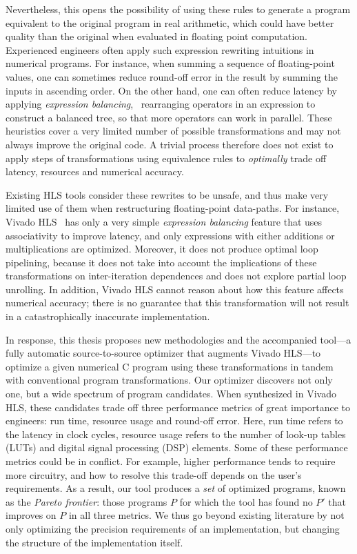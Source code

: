 Nevertheless, this opens the possibility of using these rules to generate a
program equivalent to the original program in real arithmetic, which could
have better quality than the original when evaluated in floating point
computation.  Experienced engineers often apply such expression rewriting
intuitions in numerical programs.  For instance, when summing a sequence
of floating-point values, one can sometimes reduce round-off error in the
result by summing the inputs in ascending order.  On the other hand, one can
often reduce latency by applying \emph{expression balancing}, \ie~rearranging
operators in an expression to construct a balanced tree, so that more operators
can work in parallel.  These heuristics cover a very limited number of
possible transformations and may not always improve the original code.  A
trivial process therefore does not exist to apply steps of transformations
using equivalence rules to \emph{optimally} trade off latency, resources and
numerical accuracy.

Existing HLS tools consider these rewrites to be unsafe, and thus make very
limited use of them when restructuring floating-point data-paths.  For
instance, Vivado HLS~\cite{vivado_hls} has only a very simple \emph{expression
balancing} feature that uses associativity to improve latency, and only
expressions with either additions or multiplications are optimized.  Moreover,
it does not produce optimal loop pipelining, because it does not take
into account the implications of these transformations on inter-iteration
dependences and does not explore partial loop unrolling.  In addition, Vivado
HLS cannot reason about how this feature affects numerical accuracy; there is
no guarantee that this transformation will not result in a catastrophically
inaccurate implementation.

In response, this thesis proposes new methodologies and the accompanied
tool---a fully automatic source-to-source optimizer that augments Vivado
HLS---to optimize a given numerical C program using these transformations in
tandem with conventional program transformations.  Our optimizer discovers
not only one, but a wide spectrum of program candidates.  When synthesized
in Vivado HLS, these candidates trade off three performance metrics of great
importance to engineers: run time, resource usage and round-off error.  Here,
run time refers to the latency in clock cycles, resource usage refers to
the number of look-up tables (LUTs) and digital signal processing (DSP)
elements.  Some of these performance metrics could be in conflict.  For
example, higher performance tends to require more circuitry, and how to
resolve this trade-off depends on the user's requirements.  As a result, our
tool produces a \emph{set} of optimized programs, known as the \emph{Pareto
frontier}: those programs $P$ for which the tool has found no $P'$ that
improves on $P$ in all three metrics.  We thus go beyond existing literature
by not only optimizing the precision requirements of an implementation, but
changing the structure of the implementation itself.

